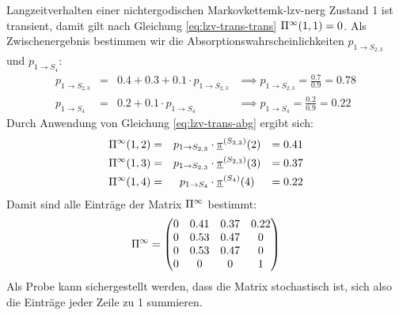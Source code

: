 \begin{example}{Langzeitverhalten einer nichtergodischen Markovkette}{mk-lzv-nerg}
Zustand 1 ist transient, damit gilt nach Gleichung \eqref{eq:lzv-trans-trans}
$\Pi^\infty(1,1) = 0$. Als Zwischenergebnis bestimmen wir die
Absorptionswahrscheinlichkeiten $p_{1\to S_{2,3}}$ und $p_{1\to S_{4}}$:
\begin{align*}
p_{1\to S_{2,3}} &=&  0.4 + 0.3 + 0.1 \cdot p_{1\to S_{2,3}}& \implies
p_{1\to S_{2,3}} = \frac{0.7}{0.9} = 0.78  \\
p_{1\to S_{4}}   &=&  0.2 + 0.1 \cdot p_{1\to S_4} &\implies
p_{1\to S_4} =\frac{0.2}{0.9} = 0.22
\end{align*}
Durch Anwendung von Gleichung \eqref{eq:lzv-trans-abg} ergibt sich:
\begin{align*}
\Pi^\infty(1,2) &=& p_{1\to S_{2,3}} &\cdot\underline{\pi}^{(S_{2,3})}(2) &= 0.41 \\
\Pi^\infty(1,3) &=& p_{1\to S_{2,3}} &\cdot\underline{\pi}^{(S_{2,3})}(3) &= 0.37 \\
\Pi^\infty(1,4) &=& p_{1\to S_4}     &\cdot\underline{\pi}^{(S_4)}    (4) &= 0.22
\end{align*}
Damit sind alle Einträge der Matrix $\Pi^\infty$ bestimmt:
\[
\Pi^\infty = \begin{pmatrix}
   0  & 0.41 & 0.37 & 0.22 \\
   0  & 0.53 & 0.47 &  0   \\
   0  & 0.53 & 0.47 &  0   \\
   0  &  0   &  0   &  1
\end{pmatrix}
\]
Als Probe kann sichergestellt werden, dass die Matrix stochastisch ist, sich
also die Einträge jeder Zeile zu 1 summieren.
\end{example}
